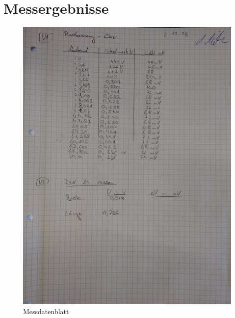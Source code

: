 \documentclass[12pt,oneside,a4paper]{report}
\begin{document}
\section{Messergebnisse}
\label{chap:APPENDIX_MEASUREMENT_SOURCE}
\begin{figure}[H]
    \centering
	\includegraphics[width=170mm,scale=0.5]{media/MessBlatt.jpg}
	\caption{Messdatenblatt}
	\label{img:MessBlatt}
\end{figure}

%
%

\end{document}
